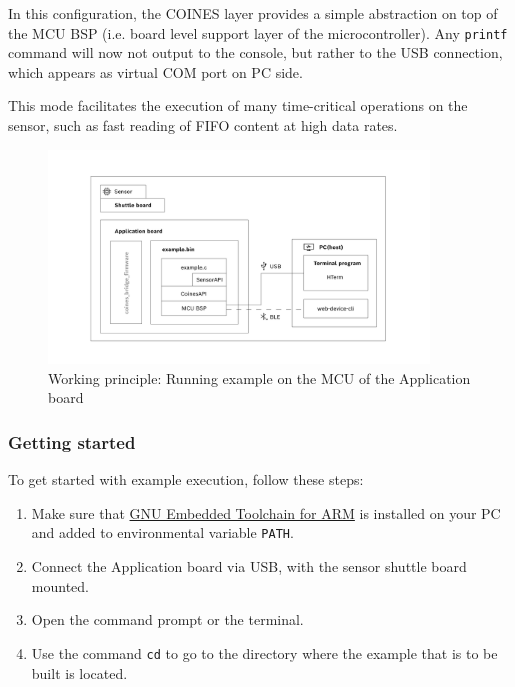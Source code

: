 \documentclass[11pt,headings=small]{scrartcl}
\begin{document}
In this configuration, the COINES layer provides a simple abstraction on top of the MCU BSP (i.e. board level support layer of the microcontroller). Any \texttt{printf} command will now not output to the console, but rather to the USB connection, which appears as virtual COM port on PC side.

This mode facilitates the execution of many time-critical operations on the sensor, such as fast reading of FIFO content at high data rates.

\begin{figure}[H]
	\begin{center}
		\includegraphics[width=0.9\textwidth]{coinesAPI_images/COINES_workingPrinciple_runOnMCU.png}
		\caption{Working principle: Running example on the MCU of the Application board}
	\end{center}
\end{figure}

\subsubsection{Getting started}
To get started with example execution, follow these steps:
\begin{enumerate}
	\item Make sure that \href{https://developer.arm.com/downloads/-/arm-gnu-toolchain-downloads}{GNU Embedded Toolchain for ARM} is installed on your PC and added to environmental variable \texttt{PATH}.
	\item Connect the Application board via USB, with the sensor shuttle board mounted.
	\item Open the command prompt or the terminal.
	\item Use the command \texttt{cd} to go to the directory where the example that is to be built is located.
\end{enumerate}
\end{document}
